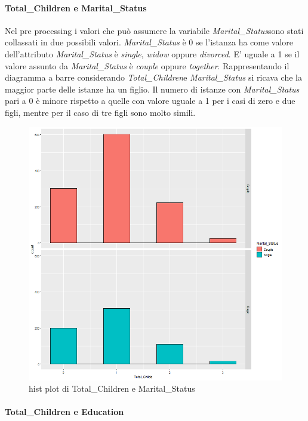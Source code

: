 \documentclass[letterpaper,11pt]{article}
\begin{document}
\newpage

\paragraph{Total\_Children e Marital\_Status}
Nel pre processing i valori che può assumere la variabile \textit{Marital\_Status}sono stati collassati in due possibili valori.
\textit{Marital\_Status} è 0 se l'istanza ha come valore dell'attributo \textit{Marital\_Status} è \textit{single}, \textit{widow} oppure \textit{divorced}.
E' uguale a 1 se il valore assunto da \textit{Marital\_Status} è \textit{couple} oppure \textit{together}.
Rappresentando il diagramma a barre considerando \textit{Total\_Children}e \textit{Marital\_Status} si ricava che la maggior parte delle istanze ha un figlio. Il numero di istanze con \textit{Marital\_Status} pari a 0 è minore rispetto a quelle con valore uguale a 1 per i casi di zero e due figli, mentre per il caso di tre figli sono molto simili.


\begin{figure}[h!]
    \centering
    \includegraphics[width=.6\textwidth]{Img/EDA/EDA017.png}
    \caption{hist plot di Total\_Children e Marital\_Status}
    \label{fig:fviz_eig(pca, addlabels = TRUE, ylim = c(0, 50))}
\end{figure}

\newpage
\paragraph{Total\_Children e Education}
\end{document}
